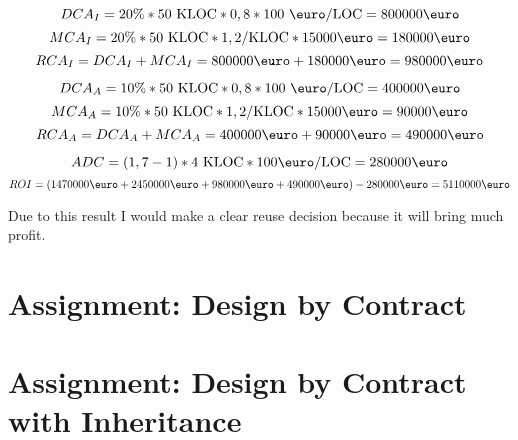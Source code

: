 \documentclass[a4paper,12pt,oneside]{scrreprt}
\begin{document}
\begin{equation*}
DCA_I = 20\% * 50 \text{ KLOC} * 0,8 * 100\text{ \euro/LOC} = 800000 \text{\euro}
\end{equation*}
\begin{equation*}
MCA_I = 20\% * 50 \text{ KLOC} * 1,2/\text{KLOC} * 15000\text{\euro} = 180000\text{\euro}
\end{equation*}
\begin{equation*}
RCA_I = DCA_I + MCA_I = 800000\text{\euro} + 180000\text{\euro} = 980000\text{\euro}
\end{equation*}

\begin{equation*}
DCA_A = 10\% * 50 \text{ KLOC} * 0,8 * 100\text{ \euro/LOC} = 400000 \text{\euro}
\end{equation*}
\begin{equation*}
MCA_A = 10\% * 50 \text{ KLOC} * 1,2/\text{KLOC} * 15000\text{\euro} = 90000\text{\euro}
\end{equation*}
\begin{equation*}
RCA_A = DCA_A + MCA_A = 400000\text{\euro} + 90000\text{\euro} = 490000\text{\euro}
\end{equation*}

\begin{equation*}
ADC =  (1,7 - 1) * 4\text{ KLOC} * 100 \text{\euro/LOC} = 280000\text{\euro}
\end{equation*}
\begin{equation*}
ROI = (1470000\text{\euro} + 2450000\text{\euro} + 980000\text{\euro} + 490000\text{\euro}) - 280000\text{\euro} = 5110000\text{\euro}
\end{equation*}

Due to this result I would make a clear reuse decision because it will bring much profit.

\section{Assignment: Design by Contract}
\section{Assignment: Design by Contract with Inheritance}
\end{document}
